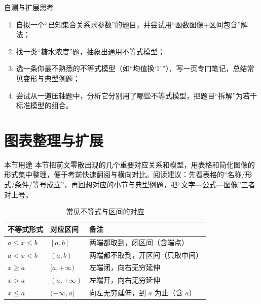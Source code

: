 \documentclass[a4paper,11pt]{ctexart}
\begin{document}
\begin{examplebox}{自测与扩展思考}
\begin{enumerate}
  \item 自拟一个“已知集合关系求参数”的题目，并尝试用“函数图像+区间包含”解法；
  \item 找一类“糖水浓度”题，抽象出通用不等式模型；
  \item 选一条你最不熟悉的不等式模型（如“均值换‘1’”），写一页专门笔记，总结常见变形与典型例题；
  \item 尝试从一道压轴题中，分析它分别用了哪些不等式模型，把题目“拆解”为若干标准模型的组合。
\end{enumerate}
\end{examplebox}

  \section{图表整理与扩展}

  \begin{summarybox}{本节用途}
  本节把前文零散出现的几个重要对应关系和模型，用表格和简化图像的形式集中整理，便于考前快速翻阅与横向对比。阅读建议：先看表格的“名称/形式/条件/等号成立”，再回想对应的小节与典型例题，把“文字—公式—图像”三者对上号。
  \end{summarybox}

  \begin{table}[htbp]
    \centering
    \caption{常见不等式与区间的对应}
    \begin{tabularx}{0.96\textwidth}{>{\raggedright\arraybackslash}p{3cm} X X}
      \toprule
      \textbf{不等式形式} & \textbf{对应区间} & \textbf{备注} \\
      \midrule
      $a\le x\le b$ & $[a,b]$ & 两端都取到，闭区间（含端点） \\
      $a<x<b$ & $(a,b)$ & 两端都不取到，开区间（只取中间） \\
      $x\ge a$ & $[a,+\infty)$ & 左端闭，向右无穷延伸 \\
      $x>a$ & $(a,+\infty)$ & 左端开，向右无穷延伸 \\
      $x\le a$ & $(-\infty,a]$ & 向左无穷延伸，到 $a$ 为止（含 $a$） \\
      \bottomrule
    \end{tabularx}
  \end{table}
\end{document}

